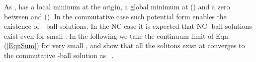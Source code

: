 \documentclass[a4paper,a4paper]{article}
\begin{document}
As \coordHE{}, \coordHE{} has a local mininum at
the origin, a global minimum at \coordHE{} (\coordHE{}) and a zero 
\coordHE{} between \coordHE{} and \coordHE{} (\coordHE{}). In
the commutative case such potential form enables the existence of \coordHE{}-
ball solutions. In the NC case it is expected that NC-\coordHE{} ball
solutions exist even for small \myHighlight{$\theta$}\coordHE{}. In the following we take the
continuum limit of Eqn. (\ref{EqnSum}) for very small \myHighlight{$\theta$}\coordHE{} ,
and show that all the solitons \coordHE{} exist at \myHighlight{$\theta\rightarrow
\infty$}\coordHE{} converges to the commutative \coordHE{}-ball solution as
\coordHE{}\ .
\end{document}
